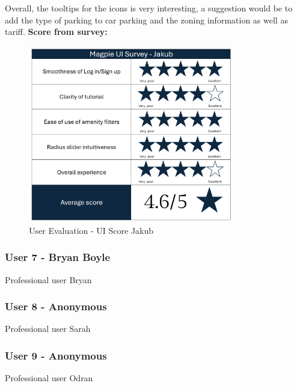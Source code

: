 Overall, the tooltips for the icons is very interesting, a suggestion would be to add the type of parking to car parking and the zoning information as well as tariff.
\textbf{Score from survey: }
\begin{figure}
    \centering
    \includegraphics[width=0.8\textwidth]{images/survey-jakub.png}
    \caption{User Evaluation - UI Score Jakub}
\end{figure}

\newpage
\subsubsection{User 7 - Bryan Boyle}
Professional user Bryan

\newpage
\subsubsection{User 8 - Anonymous}
Professional user Sarah

\newpage
\subsubsection{User 9 - Anonymous}
Professional user Odran
